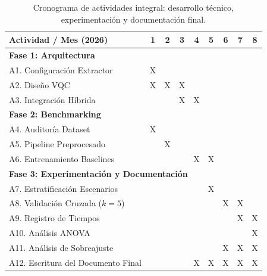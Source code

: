 \documentclass[12pt,letterpaper]{article}
\begin{document}
    \begin{table}[H]
        \centering
        \small
        \begin{tabularx}{\textwidth}{|X|c|c|c|c|c|c|c|c|}
        \hline
        \rowcolor{lightgray} \centering \textbf{Actividad / Mes (2026)} & \textbf{1} & \textbf{2} & \textbf{3} & \textbf{4} & \textbf{5} & \textbf{6} & \textbf{7} & \textbf{8} \\ \hline
        \multicolumn{9}{|l|}{\cellcolor{lightgray!50}\textbf{Fase 1: Arquitectura}} \\ \hline
        A1. Configuración Extractor & \cellcolor{blue!20}X & & & & & & & \\ \hline
        A2. Diseño VQC & \cellcolor{blue!20}X & \cellcolor{blue!20}X & \cellcolor{blue!20}X & & & & & \\ \hline
        A3. Integración Híbrida & & & \cellcolor{blue!20}X & \cellcolor{blue!20}X & & & & \\ \hline
        \multicolumn{9}{|l|}{\cellcolor{lightgray!50}\textbf{Fase 2: Benchmarking}} \\ \hline
        A4. Auditoría Dataset & \cellcolor{blue!20}X & & & & & & & \\ \hline
        A5. Pipeline Preprocesado & & \cellcolor{blue!20}X & & & & & & \\ \hline
        A6. Entrenamiento Baselines & & & & \cellcolor{blue!20}X & \cellcolor{blue!20}X & & & \\ \hline
        \multicolumn{9}{|l|}{\cellcolor{lightgray!50}\textbf{Fase 3: Experimentación y Documentación}} \\ \hline
        A7. Estratificación Escenarios & & & & & \cellcolor{blue!20}X & & & \\ \hline
        A8. Validación Cruzada ($k=5$) & & & & & & \cellcolor{blue!20}X & \cellcolor{blue!20}X & \\ \hline
        A9. Registro de Tiempos & & & & & & & \cellcolor{blue!20}X & \cellcolor{blue!20}X \\ \hline
        A10. Análisis ANOVA & & & & & & & & \cellcolor{blue!20}X \\ \hline
        A11. Análisis de Sobreajuste & & & & & & \cellcolor{blue!20}X & \cellcolor{blue!20}X & \cellcolor{blue!20}X \\ \hline
        A12. Escritura del Documento Final & & & & \cellcolor{blue!20}X & \cellcolor{blue!20}X & \cellcolor{blue!20}X & \cellcolor{blue!20}X & \cellcolor{blue!20}X \\ \hline
        \end{tabularx}
        \caption{Cronograma de actividades integral: desarrollo técnico, experimentación y documentación final.}
        \label{tab:cronograma}
    \end{table}
\end{document}
